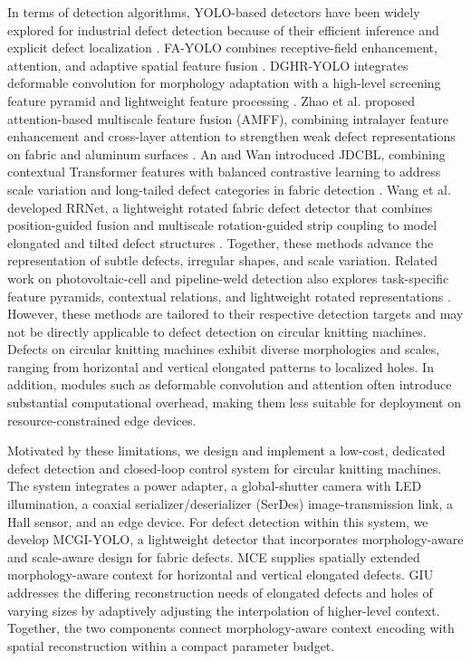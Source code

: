 \documentclass[journal]{IEEEtranTIE}
\newcommand{\model}{MCGI-YOLO\xspace}
\begin{document}
In terms of detection algorithms, YOLO-based detectors have been widely explored for industrial defect detection because of their efficient inference and explicit defect localization \cite{redmon2016yolo}. FA-YOLO combines receptive-field enhancement, attention, and adaptive spatial feature fusion \cite{yu2024fayolo}. DGHR-YOLO integrates deformable convolution for morphology adaptation with a high-level screening feature pyramid and lightweight feature processing \cite{zhang2025dghr}. Zhao et al. proposed attention-based multiscale feature fusion (AMFF), combining intralayer feature enhancement and cross-layer attention to strengthen weak defect representations on fabric and aluminum surfaces \cite{zhao2024amff}. An and Wan introduced JDCBL, combining contextual Transformer features with balanced contrastive learning to address scale variation and long-tailed defect categories in fabric detection \cite{an2025jdcbl}. Wang et al. developed RRNet, a lightweight rotated fabric defect detector that combines position-guided fusion and multiscale rotation-guided strip coupling to model elongated and tilted defect structures \cite{wang2026rrnet}. Together, these methods advance the representation of subtle defects, irregular shapes, and scale variation. Related work on photovoltaic-cell and pipeline-weld detection also explores task-specific feature pyramids, contextual relations, and lightweight rotated representations \cite{su2022baf,shen2024crnet,liu2025lrnet}. However, these methods are tailored to their respective detection targets and may not be directly applicable to defect detection on circular knitting machines. Defects on circular knitting machines exhibit diverse morphologies and scales, ranging from horizontal and vertical elongated patterns to localized holes. In addition, modules such as deformable convolution and attention often introduce substantial computational overhead, making them less suitable for deployment on resource-constrained edge devices.

Motivated by these limitations, we design and implement a low-cost, dedicated defect detection and closed-loop control system for circular knitting machines. The system integrates a power adapter, a global-shutter camera with LED illumination, a coaxial serializer/deserializer (SerDes) image-transmission link, a Hall sensor, and an edge device. For defect detection within this system, we develop \model, a lightweight detector that incorporates morphology-aware and scale-aware design for fabric defects. MCE supplies spatially extended morphology-aware context for horizontal and vertical elongated defects. GIU addresses the differing reconstruction needs of elongated defects and holes of varying sizes by adaptively adjusting the interpolation of higher-level context. Together, the two components connect morphology-aware context encoding with spatial reconstruction within a compact parameter budget.
\end{document}
